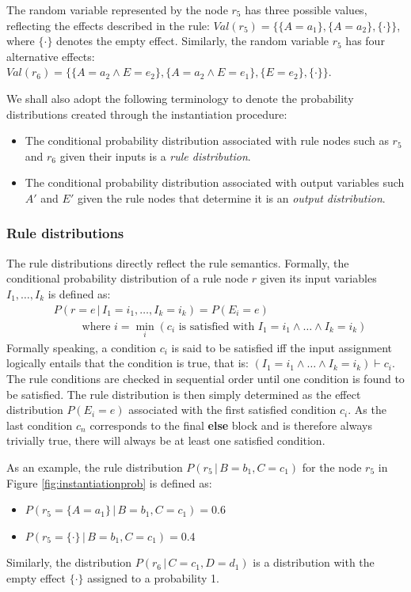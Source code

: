 The random variable represented by the node $r_5$ has three possible values, reflecting the effects described in the rule: $\textit{Val}(r_5) = \{ \{A\!=\!a_1\}, \{A\!=\!a_2\}, \{\cdot\}\}$, where $\{\cdot\}$ denotes the empty effect.  Similarly, the random variable $r_5$ has four alternative effects: $\textit{Val}(r_6) = \{\{A\!=\!a_2 \land E\!=\!e_2\}, \{A\!=\!a_2 \land E\!=\!e_1\}, \{E=e_2\}, \{\cdot\}\}$. 

We shall also adopt the following terminology to denote the probability distributions created through the instantiation procedure: 
\begin{itemize}
\item The conditional probability distribution associated with rule nodes such as $r_5$ and $r_6$ given their inputs is a \textit{rule distribution}.
\item The conditional probability distribution associated with output variables such $A'$ and $E'$ given the rule nodes that determine it is an \textit{output distribution}.
\end{itemize}

\subsubsection*{Rule distributions}

The rule distributions directly reflect the rule semantics.  Formally, the conditional probability distribution of a rule node $r$ given its input variables $I_1, \dots, I_k$ is defined as: 
\begin{align}
& P(r\!=\!e \, | \, I_1\!=\!i_1, \dots, I_k\!=\!i_k) = P(E_i = e) \label{eq:ruledistrib}
 \\ 
& \; \; \; \; \; \; \; \; \text{ where } i = \min_i (c_i \text{ is satisfied with } I_1\!=\!i_1 \land \dots \land I_k\!=\!i_k) \nonumber 
\end{align}
Formally speaking, a condition $c_i$ is said to be satisfied iff the input assignment logically entails that the condition is true, that is: $(I_1\!=\!i_1 \land \dots \land I_k\!=\!i_k) \vdash c_i$. The rule conditions are checked in sequential order until one condition is found to be satisfied. The rule distribution is then simply determined as the effect distribution $P(E_i\!=\!e)$ associated with the first satisfied condition $c_i$.  As the last condition $c_n$ corresponds to the final \textbf{else} block and is therefore always trivially true, there will always be at least one satisfied condition. 

As an example, the rule distribution $P(r_5 \, | \, B\!=\!b_1, C\!=\!c_1)$ for the node $r_5$ in Figure \ref{fig:instantiationprob} is defined as:
\begin{itemize}
\item $P(r_5 = \{A\!=\!a_1\} \, | \, B\!=\!b_1, C\!=\!c_1) = 0.6$
\item  $P(r_5 = \{\cdot\} \, | \, B\!=\!b_1, C\!=\!c_1) = 0.4$
\end{itemize}
Similarly, the distribution $P(r_6 \, | \, C\!=\!c_1, D\!=\!d_1)$ is a distribution with the empty effect $\{\cdot\}$ assigned to a probability 1. 

